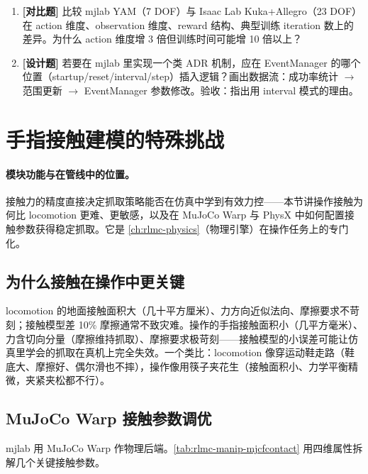\begin{practice}[本节练习]
\begin{enumerate}
  \item \textbf{[对比题]} 比较 mjlab YAM（7 DOF）与 Isaac Lab Kuka+Allegro（23 DOF）在 action 维度、observation 维度、reward 结构、典型训练 iteration 数上的差异。为什么 action 维度增 3 倍但训练时间可能增 10 倍以上？
  \item \textbf{[设计题]} 若要在 mjlab 里实现一个类 ADR 机制，应在 EventManager 的哪个位置（startup/reset/interval/step）插入逻辑？画出数据流：成功率统计 $\to$ 范围更新 $\to$ EventManager 参数修改。验收：指出用 interval 模式的理由。
\end{enumerate}
\end{practice}

\section{手指接触建模的特殊挑战}
\label{sec:rlmc-manip-contact}

\paragraph{模块功能与在管线中的位置。}接触力的精度直接决定抓取策略能否在仿真中学到有效力控——本节讲操作接触为何比 locomotion 更难、更敏感，以及在 MuJoCo Warp 与 PhysX 中如何配置接触参数获得稳定抓取。它是 \cref{ch:rlmc-physics}（物理引擎）在操作任务上的专门化。

\subsection{为什么接触在操作中更关键}
\label{sec:rlmc-manip-whycontact}

locomotion 的地面接触面积大（几十平方厘米）、力方向近似法向、摩擦要求不苛刻；接触模型差 10\% 摩擦通常不致灾难。操作的手指接触面积小（几平方毫米）、力含切向分量（摩擦维持抓取）、摩擦要求极苛刻——接触模型的小误差可能让仿真里学会的抓取在真机上完全失效。一个类比：locomotion 像穿运动鞋走路（鞋底大、摩擦好、偶尔滑也不摔），操作像用筷子夹花生（接触面积小、力学平衡精微，夹紧夹松都不行）。

\subsection{MuJoCo Warp 接触参数调优}
\label{sec:rlmc-manip-mujococontact}

mjlab 用 MuJoCo Warp 作物理后端。\cref{tab:rlmc-manip-mjcfcontact} 用四维属性拆解几个关键接触参数。

